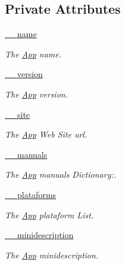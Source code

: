 \subsection*{Private Attributes}
\begin{CompactItemize}
\item 
\hyperlink{classwinsollib_1_1App_c56363d9474206472085a1deed0bb2d5}{\_\-\_\-name}
\begin{CompactList}\small\item\em The \hyperlink{classwinsollib_1_1App}{App} name. \item\end{CompactList}\item 
\hyperlink{classwinsollib_1_1App_4276b8c90e4fdf69f92dfb05893b12fa}{\_\-\_\-version}
\begin{CompactList}\small\item\em The \hyperlink{classwinsollib_1_1App}{App} version. \item\end{CompactList}\item 
\hyperlink{classwinsollib_1_1App_96d35fa04f998f21266d8e26816c3569}{\_\-\_\-site}
\begin{CompactList}\small\item\em The \hyperlink{classwinsollib_1_1App}{App} Web Site url. \item\end{CompactList}\item 
\hyperlink{classwinsollib_1_1App_1af4cfd72ef4f2e4ce69304a2aa34b5f}{\_\-\_\-manuals}
\begin{CompactList}\small\item\em The \hyperlink{classwinsollib_1_1App}{App} manuals Dictionary:. \item\end{CompactList}\item 
\hyperlink{classwinsollib_1_1App_8285d15c71e3dfe2099d89fdc915413a}{\_\-\_\-plataforms}
\begin{CompactList}\small\item\em The \hyperlink{classwinsollib_1_1App}{App} plataform List. \item\end{CompactList}\item 
\hyperlink{classwinsollib_1_1App_5387bab0522347c6e1d83469f8629c3c}{\_\-\_\-minidescription}
\begin{CompactList}\small\item\em The \hyperlink{classwinsollib_1_1App}{App} minidescription. \item\end{CompactList}\item 

\end{CompactItemize}
